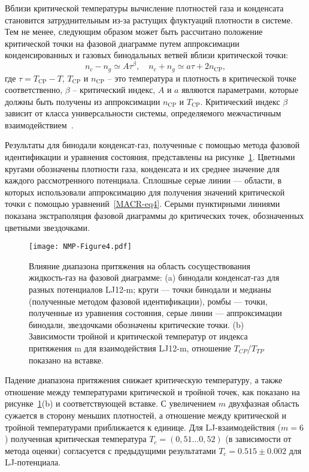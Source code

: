 Вблизи критической температуры вычисление плотностей газа и конденсата становится затруднительным из-за растущих флуктуаций плотности в системе.
Тем не менее, следующим образом может быть рассчитано положение критической точки на фазовой диаграмме путем аппроксимации конденсированных и газовых бинодальных ветвей вблизи критической точки:
\begin{equation}
    n_{c}-n_{g} \simeq A \tau^{\beta}, \quad n_{c}+n_{g} \simeq a \tau+2 n_{\mathrm{CP}},
\label{MACR-eq4}
\end{equation}
где $\tau=T_{\mathrm{CP}}-T$, $T_{\mathrm{CP}}$ и $n_{\mathrm{CP}}$ -- это температура и 
плотность в критической точке соответственно, $\beta$ -- критический индекс, $A$ и $a$ являются параметрами, которые должны быть получены из аппроксимации $n_{\mathrm{CP}}$ и $T_{\mathrm{CP}}$.
Критический индекс $\beta$ зависит от класса универсальности системы, определяемого межчастичным взаимодействием~\cite{10.1103/physrevlett.89.025703}.

Результаты для бинодали конденсат-газ, полученные с помощью метода фазовой идентификации и уравнения состояния, представлены на рисунке~\ref{nmp}.
Цветными кругами обозначены плотности газа, конденсата и их среднее значение для каждого рассмотренного потенциала. 
Сплошные серые линии — области, в которых использовали аппроксимацию для получения значений критической точки с помощью уравнений~\ref{MACR-eq4}. 
Серыми пунктирными линиями показана экстраполяция фазовой диаграммы до критических точек, обозначенных цветными звездочками.

\begin{figure}[!h]
\begin{center}
\texttt{[image: NMP-Figure4.pdf]}
\caption{Влияние диапазона притяжения на область сосуществования жидкость-газ на фазовой диаграмме: (a) бинодали конденсат-газ для разных потенциалов LJ12-m; круги — точки бинодали и медианы (полученные методом фазовой идентификации), ромбы — точки, полученные из уравнения состояния, серые линии — аппроксимации бинодали, звездочками обозначены критические точки.
	(b) Зависимости тройной и критической температур от индекса притяжения m для взаимодействия LJ12-m, отношение $T_{CP}$/$T_{TP}$ показано на вставке.}
\label{nmp}
\end{center}
\end{figure}

Падение диапазона притяжения снижает критическую температуру, а также отношение между температурами критической и тройной точек, как показано на рисунке~\ref{nmp}(b) и соответствующей вставке.
С увеличением $m$ двухфазная область сужается в сторону меньших плотностей, а отношение между критической и тройной температурами приближается к единице.
Для LJ-взаимодействия ($m = 6$) полученная критическая температура $T_c=(0,51 . . . 0,52)$ (в зависимости от метода оценки) согласуется с предыдущими результатами $T_c = 0.515 \pm 0.002$  для LJ-потенциала.

